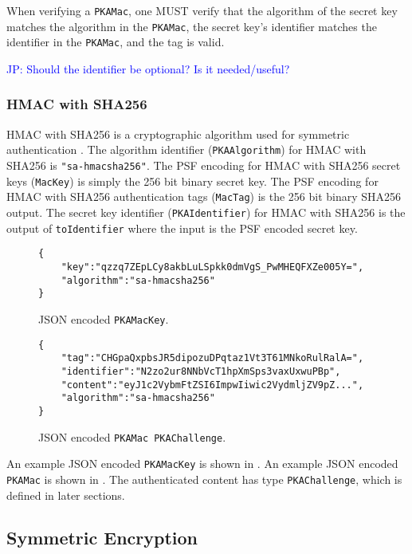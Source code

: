 \documentclass{article}
\newcommand{\jp}[1]{\textcolor{blue}{JP: #1}}
\begin{document}
When verifying a \texttt{PKAMac}, one MUST verify that the algorithm of the secret key matches the algorithm in the \texttt{PKAMac}, the secret key's identifier matches the identifier in the \texttt{PKAMac}, and the tag is valid. 

\jp{Should the identifier be optional? Is it needed/useful?}

\subsubsection{HMAC with SHA256}

HMAC with SHA256 is a cryptographic algorithm used for symmetric authentication \cite{rfc4868}. %
The algorithm identifier (\texttt{PKAAlgorithm}) for HMAC with SHA256 is \texttt{"sa-hmacsha256"}. 
The PSF encoding for HMAC with SHA256 secret keys (\texttt{MacKey}) is simply the 256 bit binary secret key. 
The PSF encoding for HMAC with SHA256 authentication tags (\texttt{MacTag}) is the 256 bit binary SHA256 output. 
The secret key identifier (\texttt{PKAIdentifier}) for HMAC with SHA256 is the output of \texttt{toIdentifier} where the input is the PSF encoded secret key. 

\begin{figure}
\begin{lstlisting}
{
    "key":"qzzq7ZEpLCy8akbLuLSpkk0dmVgS_PwMHEQFXZe005Y=",
    "algorithm":"sa-hmacsha256"
}
\end{lstlisting}
\caption{JSON encoded \texttt{PKAMacKey}.}
\label{code:pkamackey}
\end{figure}

\begin{figure}
\begin{lstlisting}
{
    "tag":"CHGpaQxpbsJR5dipozuDPqtaz1Vt3T61MNkoRulRalA=",
    "identifier":"N2zo2ur8NNbVcT1hpXmSps3vaxUxwuPBp",
    "content":"eyJ1c2VybmFtZSI6ImpwIiwic2VydmljZV9pZ...",
    "algorithm":"sa-hmacsha256"
}
\end{lstlisting}
\caption{JSON encoded \texttt{PKAMac PKAChallenge}.}
\label{code:pkamacchallenge}
\end{figure}


An example JSON encoded \texttt{PKAMacKey} is shown in . 
An example JSON encoded \texttt{PKAMac} is shown in . 
The authenticated content has type \texttt{PKAChallenge}, which is defined in later sections. 



\subsection{Symmetric Encryption}
\end{document}
